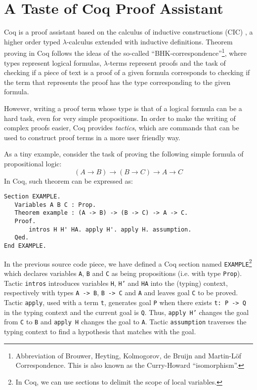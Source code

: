\section{A Taste of Coq Proof Assistant}\label{coq}

Coq is a proof assistant based on the calculus of inductive
constructions (CIC) , a higher order typed
$\lambda$-calculus extended with inductive definitions.  Theorem
proving in Coq follows the ideas of the so-called
``BHK-cor\-res\-pon\-dence''\footnote{Abbreviation of Brouwer, Heyting,
  Kolmogorov, de Bruijn and Martin-L\"of Correspondence. This is also
  known as the Curry-Howard ``isomorphism''.}, where types represent
logical formulas, $\lambda$-terms represent proofs
 and the task of checking if a piece of text is a
proof of a given formula corresponds to checking if the term that
represents the proof has the type corresponding to the given formula.

However, writing a proof term whose type is that of a logical formula
can be a hard task, even for very simple propositions.  In order to
make the writing of complex proofs easier, Coq provides
\emph{tactics}, which are commands that can be used to construct proof
terms in a more user friendly way.

As a tiny example, consider the task of proving the following simple
formula of propositional logic:
\[
(A \to B)\to (B\to C) \to A \to C
\]
In Coq, such theorem can be expressed as:
\begin{lstlisting}
Section EXAMPLE.
   Variables A B C : Prop.
   Theorem example : (A -> B) -> (B -> C) -> A -> C.
   Proof.
       intros H H' HA. apply H'. apply H. assumption. 
   Qed.
End EXAMPLE.
\end{lstlisting}
In the previous source code piece, we have defined a Coq section named
\texttt{EXAMPLE}\footnote{In Coq, we can use sections to delimit the
  scope of local variables.} which declares variables \texttt{A},
\texttt{B} and \texttt{C} as being propositions (i.e. with type
\texttt{Prop}). Tactic \texttt{intros} introduces variables
\texttt{H}, \texttt{H'} and \texttt{HA} into the (typing) context,
respectively with types \texttt{A -> B}, \texttt{B -> C} and
\texttt{A} and leaves goal \texttt{C} to be proved. Tactic
\texttt{apply}, used with a term \texttt{t}, generates goal \texttt{P}
when there exists \texttt{t: P -> Q} in the typing context and the
current goal is \texttt{Q}. Thus, \texttt{apply H'} changes the goal
from \texttt{C} to \texttt{B} and \texttt{apply H} changes the goal to
\texttt{A}. Tactic \texttt{assumption} traverses the typing context to
find a hypothesis that matches with the goal.

